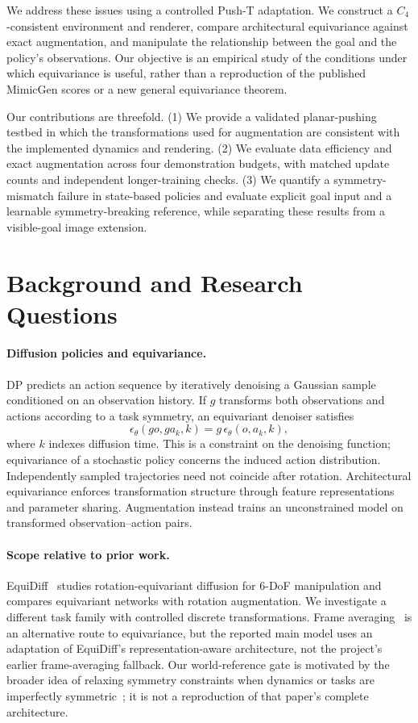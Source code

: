 We address these issues using a controlled Push-T adaptation. We construct
a $C_4$-consistent environment and renderer, compare architectural equivariance
against exact augmentation, and manipulate the relationship between the
goal and the policy's observations. Our objective is an empirical study of
the conditions under which equivariance is useful, rather than a reproduction
of the published MimicGen scores or a new general equivariance theorem.

Our contributions are threefold. (1) We provide a validated planar-pushing
testbed in which the transformations used for augmentation are consistent
with the implemented dynamics and rendering. (2) We evaluate data efficiency
and exact augmentation across four demonstration budgets, with matched
update counts and independent longer-training checks. (3) We quantify a
symmetry-mismatch failure in state-based policies and evaluate explicit goal
input and a learnable symmetry-breaking reference, while separating these
results from a visible-goal image extension.

\section{Background and Research Questions}
\label{eqstudy:sec:background}
\paragraph{Diffusion policies and equivariance.}
DP predicts an action sequence by iteratively denoising a Gaussian sample
conditioned on an observation history. If $g$ transforms both observations
and actions according to a task symmetry, an equivariant denoiser satisfies
\begin{equation}
 \epsilon_\theta(g o, g a_k, k)
 = g\,\epsilon_\theta(o,a_k,k),
 \label{eqstudy:eq:equivariance}
\end{equation}
where $k$ indexes diffusion time. This is a constraint on the denoising
function; equivariance of a stochastic policy concerns the induced action
distribution. Independently sampled trajectories need not coincide after
rotation. Architectural equivariance enforces transformation structure
through feature representations and parameter sharing. Augmentation instead
trains an unconstrained model on transformed observation--action pairs.

\paragraph{Scope relative to prior work.}
EquiDiff~\cite{wang2024equivariant} studies rotation-equivariant diffusion for
6-DoF manipulation and compares equivariant networks with rotation
augmentation. We investigate a different task family with controlled discrete
transformations. Frame averaging~\cite{puny2022frame} is an alternative route
to equivariance, but the reported main model uses an adaptation of EquiDiff's
representation-aware architecture, not the project's earlier frame-averaging
fallback. Our world-reference gate is motivated by the broader idea of
relaxing symmetry constraints when dynamics or tasks are imperfectly
symmetric~\cite{wang2022approximately}; it is not a reproduction of that
paper's complete architecture.

